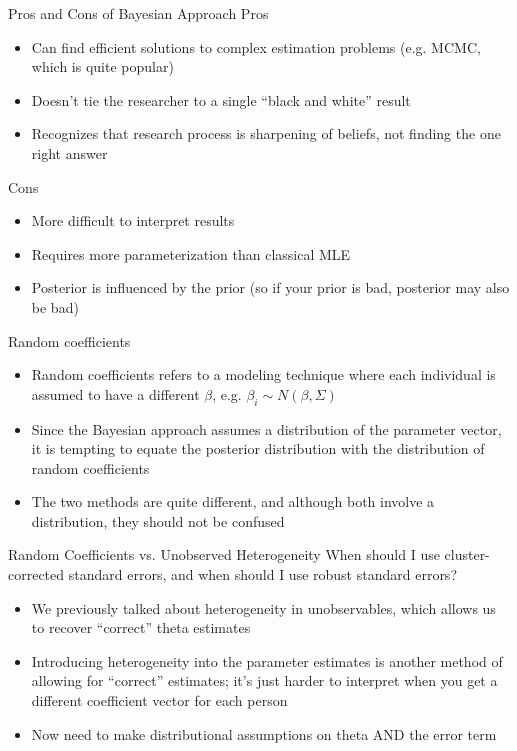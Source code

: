 \documentclass[english,xcolor=dvipsnames]{beamer}
\begin{document}
\begin{frame}{Pros and Cons of Bayesian Approach}
Pros
\begin{itemize}
	\item Can find efficient solutions to complex estimation problems (e.g. MCMC, which is quite popular)
	\item Doesn't tie the researcher to a single ``black and white'' result
	\item Recognizes that research process is sharpening of beliefs, not finding the one right answer
\end{itemize}
Cons
\begin{itemize}
	\item More difficult to interpret results
	\item Requires more parameterization than classical MLE
	\item Posterior is influenced by the prior (so if your prior is bad, posterior may also be bad)
\end{itemize}
\end{frame}

\begin{frame}{Random coefficients}
\begin{itemize}
	\item Random coefficients refers to a modeling technique where each individual is assumed to have a different $\beta$, e.g. $\beta_{i} \sim N(\beta,\Sigma)$
	\item Since the Bayesian approach assumes a distribution of the parameter vector, it is tempting to equate the posterior distribution with the distribution of random coefficients
	\item The two methods are quite different, and although both involve a distribution, they should not be confused
\end{itemize}
\end{frame}

\begin{frame}{Random Coefficients vs. Unobserved Heterogeneity}
When should I use cluster-corrected standard errors, and when should I use robust standard errors?
\begin{itemize}
	\item We previously talked about heterogeneity in unobservables, which allows us to recover ``correct'' theta estimates
	\item Introducing heterogeneity into the parameter estimates is another method of allowing for ``correct'' estimates; it's just harder to interpret when you get a different coefficient vector for each person
	\item Now need to make distributional assumptions on theta AND the error term
\end{itemize}
\end{frame}
\end{document}
